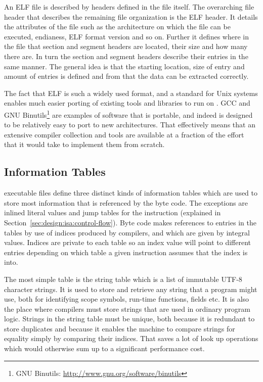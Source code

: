 An ELF file is described by headers defined in the file itself. The overarching
file header that describes the remaining file organization is the ELF header. It
details the attributes of the file such as the architecture on which the file
can be executed, endianess, ELF format version and so on. Further it defines
where in the file that section and segment headers are located, their size and
how many there are. In turn the section and segment headers describe their
entries in the same manner. The general idea is that the starting location, size
of entry and amount of entries is defined and from that the data can be
extracted correctly.

The fact that ELF is such a widely used format, and a standard for Unix systems
enables much easier porting of existing tools and libraries to run on
\thename{}. GCC and GNU Binutils\footnote{GNU Binutils:
  \url{http://www.gnu.org/software/binutils}} are examples of software that is
portable, and indeed is designed to be relatively easy to port to new
architectures. That effectively means that an extensive compiler collection and
tools are available at a fraction of the effort that it would take to implement
them from scratch.

\subsection{Information Tables}

\thename{} executable files define three distinct kinds of information tables
which are used to store most information that is referenced by the byte
code. The exceptions are inlined literal values and jump tables for the
 instruction (explained in
Section~\ref{sec:design:isa:control-flow}). Byte code makes references to
entries in the tables by use of indices produced by compilers, and which are
given by integral values. Indices are private to each table so an index value
will point to different entries depending on which table a given instruction
assumes that the index is into.

The most simple table is the string table which is a list of immutable UTF-8
character strings. It is used to store and retrieve any string that a program
might use, both for identifying scope symbols, run-time functions, fields
etc. It is also the place where compilers must store strings that are used in
ordinary program logic. Strings in the string table must be unique, both because
it is redundant to store duplicates and because it enables the machine to
compare strings for equality simply by comparing their indices. That saves a lot
of look up operations which would otherwise sum up to a significant performance
cost.

